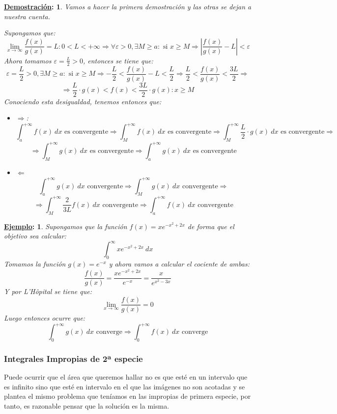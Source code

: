 \documentclass[10pt,a4paper,openright]{book}
\theoremstyle{break}
\newtheorem*{demo}{\underline{Demostración}:}
\newtheorem*{ej}{\underline{Ejemplo}:}
\newcommand{\dif}[1]{\ d#1}
\begin{document}
\begin{demo}
Vamos a hacer la primera demostración y las otras se dejan a nuestra cuenta.

Supongamos que:
$$\lim_{x \to \infty} \frac{f(x)}{g(x)} = L : 0 < L < +\infty\Rightarrow \forall \varepsilon > 0, \exists M \geq a: \mbox{ si } x \geq M \Rightarrow \left| \frac{f(x)}{g(x)} - L\right| < \varepsilon$$
Ahora tomamos $\varepsilon = \frac{L}{2} > 0$, entonces se tiene que:
$$ \varepsilon = \frac{L}{2}> 0, \exists M \geq a: \mbox{ si } x \geq M \Rightarrow -\frac{L}{2} < \frac{f(x)}{g(x)} - L < \frac{L}{2} \Rightarrow \frac{L}{2} < \frac{f(x)}{g(x)} < \frac{3L}{2}\Rightarrow$$
$$\Rightarrow \frac{L}{2} \cdot g(x) < f(x) <  \frac{3L}{2} \cdot g(x) : x\geq M$$
Conociendo esta desigualdad, tenemos entonces que:
\begin{itemize}
\item $\Rightarrow $:
$$\int_{a}^{+\infty} f(x)\dif{x}\mbox{ es convergente}\Rightarrow \int_{M}^{+\infty} f(x)\dif{x}\mbox{ es convergente}\Rightarrow \int_{M}^{+\infty} \frac{L}{2} \cdot g(x)\dif{x}\mbox{ es convergente}\Rightarrow$$
$$\Rightarrow \int_{M}^{+\infty} g(x)\dif{x} \mbox{ es convergente}\Rightarrow \int_{a}^{+\infty} g(x)\dif{x}\mbox{ es convergente}$$
\item $\Leftarrow$
$$\int_{a}^{+\infty} g(x)\dif{x} \mbox{ convergente}\Rightarrow \int_{M}^{+\infty} g(x)\dif{x} \mbox{ convergente}\Rightarrow$$
$$\Rightarrow \int_{M}^{+\infty} \frac{2}{3L} f(x)\dif{x} \mbox{ convergente} \Rightarrow \int_{a}^{+\infty} f(x)\dif{x} \mbox{ convergente}$$
\end{itemize}
\end{demo}

\begin{ej}
Supongamos que la función $f(x) = xe^{-x^2+2x}$ de forma que el objetivo sea calcular:
$$\int_{0}^{\infty} x e^{-x^2+2x} \dif{x}$$
Tomamos la función $g(x) = e^{-x}$ y ahora vamos a calcular el cociente de ambas:
$$\frac{f(x)}{g(x)} = \frac{xe^{-x^2+2x}}{e^{-x}} = \frac{x}{e^{x^2-3x}}$$
Y por L'Hôpital se tiene que:
$$\lim_{x \rightarrow \infty} \frac{f(x)}{g(x)} = 0$$
Luego entonces ocurre que:
$$\int_{0}^{+\infty} g(x)\dif{x}\mbox{ converge}\Rightarrow \int_{0}^{+\infty} f(x)\dif{x}\mbox{ converge}$$
\end{ej}

\subsubsection{Integrales Impropias de 2ª especie}
Puede ocurrir que el área que queremos hallar no es que esté en un intervalo que es infinito sino que esté en intervalo en el que las imágenes no son acotadas y se plantea el mismo problema que teníamos en las impropias de primera especie, por tanto, es razonable pensar que la solución es la misma.
\end{document}
